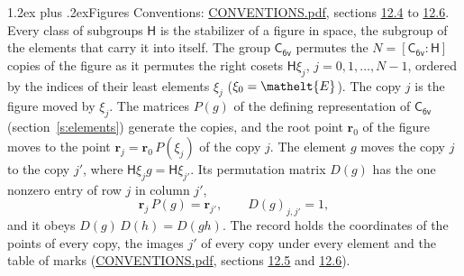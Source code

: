 \documentclass[10pt,a4paper]{article}
\makeatletter
\renewcommand\section{\@startsection{section}{1}{\z@}{-3ex plus -1ex minus -.2ex}%
  {1.2ex plus .2ex}{\normalfont\large\sffamily\bfseries\color{parttitle}}}
\numberwithin{equation}{section}
\newcommand{\eltfont}[1]{{\let\sigma\eltsigma\mathelt{#1}}}
\newcommand{\grp}[1]{\mathsf{#1}}
\newcommand{\cls}[1]{\eltfont{#1}}
\newcommand{\pointr}{\mathbf{r}}
\makeatother
\begin{document}
\section{Figures}\label{s:permutation}
Conventions: \href{../../CONVENTIONS.pdf}{CONVENTIONS.pdf}, sections \href{../../CONVENTIONS.pdf\#conv.12.4}{12.4} to \href{../../CONVENTIONS.pdf\#conv.12.6}{12.6}.
Every class of subgroups $\grp{H}$ is the stabilizer of a figure in space, the subgroup of the elements that carry it into itself. \label{n:local.orbit.size}\label{n:element.coset.least}\label{n:index.coset}The group $\grp{C_{6v}}$ permutes the $N = [\grp{C_{6v}} : \grp{H}]$ copies of the figure as it permutes the right cosets $\grp{H}\xi_j$, $j = 0, 1, \dots, N - 1$, ordered by the indices of their least elements $\xi_j$ ($\xi_0 = \cls{E}$). The copy $j$ is the figure moved by $\xi_j$. The matrices $P(g)$ of the defining representation of $\grp{C_{6v}}$ (section~\ref{s:elements}) generate the copies, and the root point $\pointr_0$ of the figure moves to the point $\pointr_j = \pointr_0\, P(\xi_j)$ of the copy $j$. \label{n:local.coset.image}The element $g$ moves the copy $j$ to the copy $j'$, where $\grp{H}\xi_j g = \grp{H}\xi_{j'}$. \label{n:local.matrix.permutation}Its permutation matrix $D(g)$ has the one nonzero entry of row $j$ in column $j'$,
\begin{equation}\label{e:perm.matrix}\pointr_j\, P(g) = \pointr_{j'}, \qquad D(g)_{j,j'} = 1,\end{equation}
and it obeys $D(g)\, D(h) = D(gh)$. The record holds the coordinates of the points of every copy, the images $j'$ of every copy under every element and the table of marks (\href{../../CONVENTIONS.pdf}{CONVENTIONS.pdf}, sections \href{../../CONVENTIONS.pdf\#conv.12.5}{12.5} and \href{../../CONVENTIONS.pdf\#conv.12.6}{12.6}).
\end{document}
